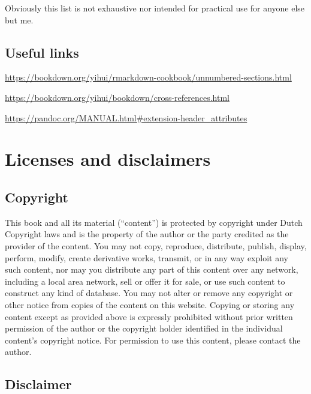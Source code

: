 \documentclass[
]{book}
\begin{document}
Obviously this list is not exhaustive nor intended for practical use for anyone else but me.

\hypertarget{useful-links}{%
\section{Useful links}\label{useful-links}}

\url{https://bookdown.org/yihui/rmarkdown-cookbook/unnumbered-sections.html}

\url{https://bookdown.org/yihui/bookdown/cross-references.html}

\url{https://pandoc.org/MANUAL.html\#extension-header_attributes}

\hypertarget{licenses-and-disclaimers}{%
\chapter*{Licenses and disclaimers}\label{licenses-and-disclaimers}}

\hypertarget{copyright}{%
\section{Copyright}\label{copyright}}

This book and all its material (``content'') is protected by copyright under Dutch Copyright laws and is the property of the author or the party credited as the provider of the content. You may not copy, reproduce, distribute, publish, display, perform, modify, create derivative works, transmit, or in any way exploit any such content, nor may you distribute any part of this content over any network, including a local area network, sell or offer it for sale, or use such content to construct any kind of database. You may not alter or remove any copyright or other notice from copies of the content on this website. Copying or storing any content except as provided above is expressly prohibited without prior written permission of the author or the copyright holder identified in the individual content's copyright notice. For permission to use this content, please contact the author.

\hypertarget{disclaimer}{%
\section{Disclaimer}\label{disclaimer}}
\end{document}
